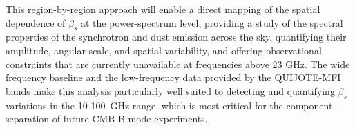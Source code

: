 This region-by-region approach will enable a direct mapping of the spatial dependence of $\beta_s$ at the power-spectrum level, providing a study of the spectral properties of the synchrotron and dust emission across the sky, quantifying their amplitude, angular scale, and spatial variability, and offering observational constraints that are currently unavailable at frequencies above 23 GHz. The wide frequency baseline and the low-frequency data provided by the QUIJOTE-MFI bands make this analysis particularly well suited to detecting and quantifying $\beta_s$ variations in the 10-100~GHz range, which is most critical for the component separation of future CMB B-mode experiments.



